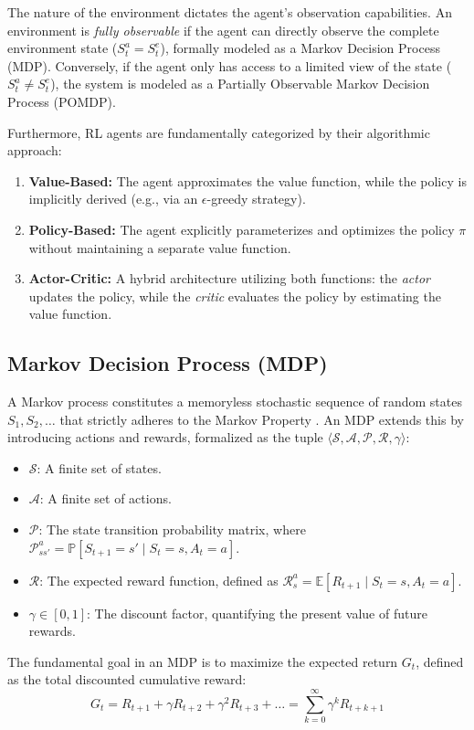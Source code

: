 \documentclass[a4paper]{scrartcl}
\begin{document}
The nature of the environment dictates the agent's observation capabilities. An environment is \textit{fully observable} if the agent can directly observe the complete environment state ($S_t^a = S_t^e$), formally modeled as a Markov Decision Process (MDP). Conversely, if the agent only has access to a limited view of the state ($S_t^a \neq S_t^e$), the system is modeled as a Partially Observable Markov Decision Process (POMDP).

Furthermore, RL agents are fundamentally categorized by their algorithmic approach:
\begin{enumerate}
    \item \textbf{Value-Based:} The agent approximates the value function, while the policy is implicitly derived (e.g., via an $\epsilon$-greedy strategy).
    \item \textbf{Policy-Based:} The agent explicitly parameterizes and optimizes the policy $\pi$ without maintaining a separate value function.
    \item \textbf{Actor-Critic:} A hybrid architecture utilizing both functions: the \textit{actor} updates the policy, while the \textit{critic} evaluates the policy by estimating the value function.
\end{enumerate}

\subsection{Markov Decision Process (MDP)}
A Markov process constitutes a memoryless stochastic sequence of random states $S_1, S_2, \dots$ that strictly adheres to the Markov Property \cite{BasharinLangvilleNaumov2004}. An MDP extends this by introducing actions and rewards, formalized as the tuple $\langle \mathcal{S}, \mathcal{A}, \mathcal{P}, \mathcal{R}, \gamma \rangle$:
\begin{itemize}
    \item $\mathcal{S}$: A finite set of states.
    \item $\mathcal{A}$: A finite set of actions.
    \item $\mathcal{P}$: The state transition probability matrix, where $\mathcal{P}_{ss'}^a = \mathbb{P}[S_{t+1} = s' \mid S_t = s, A_t = a]$.
    \item $\mathcal{R}$: The expected reward function, defined as $\mathcal{R}_s^a = \mathbb{E}[R_{t+1} \mid S_t = s, A_t = a]$.
    \item $\gamma \in [0, 1]$: The discount factor, quantifying the present value of future rewards.
\end{itemize}
The fundamental goal in an MDP is to maximize the expected return $G_t$, defined as the total discounted cumulative reward:
\begin{equation}
G_t = R_{t+1} + \gamma R_{t+2} + \gamma^2 R_{t+3} + \dots = \sum_{k=0}^{\infty} \gamma^k R_{t+k+1}
\end{equation}
\end{document}
